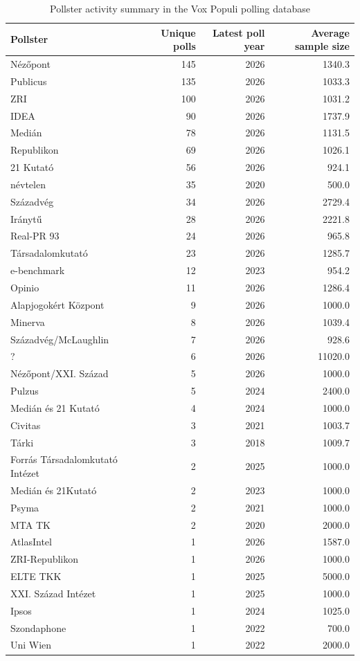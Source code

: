 \begin{table}
\caption{Pollster activity summary in the Vox Populi polling database}
\label{tab:pollster_activity_summary}
\begin{tabular}{lrrr}
\toprule
Pollster & Unique polls & Latest poll year & Average sample size \\
\midrule
Nézőpont & 145 & 2026 & 1340.3 \\
Publicus & 135 & 2026 & 1033.3 \\
ZRI & 100 & 2026 & 1031.2 \\
IDEA & 90 & 2026 & 1737.9 \\
Medián & 78 & 2026 & 1131.5 \\
Republikon & 69 & 2026 & 1026.1 \\
21 Kutató & 56 & 2026 & 924.1 \\
névtelen & 35 & 2020 & 500.0 \\
Századvég & 34 & 2026 & 2729.4 \\
Iránytű & 28 & 2026 & 2221.8 \\
Real-PR 93 & 24 & 2026 & 965.8 \\
Társadalomkutató & 23 & 2026 & 1285.7 \\
e-benchmark & 12 & 2023 & 954.2 \\
Opinio & 11 & 2026 & 1286.4 \\
Alapjogokért Központ & 9 & 2026 & 1000.0 \\
Minerva & 8 & 2026 & 1039.4 \\
Századvég/McLaughlin & 7 & 2026 & 928.6 \\
? & 6 & 2026 & 11020.0 \\
Nézőpont/XXI. Század & 5 & 2026 & 1000.0 \\
Pulzus & 5 & 2024 & 2400.0 \\
Medián és 21 Kutató & 4 & 2024 & 1000.0 \\
Civitas & 3 & 2021 & 1003.7 \\
Tárki & 3 & 2018 & 1009.7 \\
Forrás Társadalomkutató Intézet & 2 & 2025 & 1000.0 \\
Medián és 21Kutató & 2 & 2023 & 1000.0 \\
Psyma & 2 & 2021 & 1000.0 \\
MTA TK & 2 & 2020 & 2000.0 \\
AtlasIntel & 1 & 2026 & 1587.0 \\
ZRI-Republikon & 1 & 2026 & 1000.0 \\
ELTE TKK & 1 & 2025 & 5000.0 \\
XXI. Század Intézet & 1 & 2025 & 1000.0 \\
Ipsos & 1 & 2024 & 1025.0 \\
Szondaphone & 1 & 2022 & 700.0 \\
Uni Wien & 1 & 2022 & 2000.0 \\
\bottomrule
\end{tabular}
\end{table}
